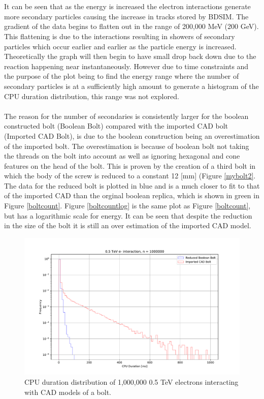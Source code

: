 \documentclass[12pt,a4paper]{article}
\begin{document}
\\\\
\noindent It can be seen that as the energy is increased the electron interactions generate more secondary particles causing the increase in tracks stored by BDSIM. The gradient of the data begins to flatten out in the range of 200,000 MeV (200 GeV). This flattening is due to the interactions resulting in showers of secondary particles which occur earlier and earlier as the particle energy is increased. Theoretically the graph will then begin to have small drop back down due to the reaction happening near instantaneously. However due to time constraints and the purpose of the plot being to find the energy range where the number of secondary particles is at a sufficiently high amount to generate a histogram of the CPU duration distribution, this range was not explored.
\\\\
\noindent The reason for the number of secondaries is consistently larger for the boolean constructed bolt (Boolean Bolt) compared with the imported CAD bolt (Imported CAD Bolt), is due to the boolean construction being an overestimation of the imported bolt. The overestimation is because of boolean bolt not taking the threads on the bolt into account as well as ignoring hexagonal and cone features on the head of the bolt. This is proven by the creation of a third bolt in which the body of the screw is reduced to a constant 12 [mm] (Figure \ref{mybolt2}. The data for the reduced bolt is plotted in blue and is a much closer to fit to that of the imported CAD than the orginal boolean replica, which is shown in green in Figure \ref{boltcount}. Figure \ref{boltcountlog} is the same plot as Figure \ref{boltcount}, but has a logarithmic scale for energy. It can be seen that despite the reduction in the size of the bolt it is still an over estimation of the imported CAD model. 
\\
\begin{figure}[h!]
\centering
\includegraphics[scale=0.5]{Images//CAD_Screw//boltdist.pdf}
\caption[width=\columnwidth]{CPU duration distribution of 1,000,000 0.5 TeV electrons interacting with CAD models of a bolt.}
\label{lastplot}
\end{figure}
\end{document}
